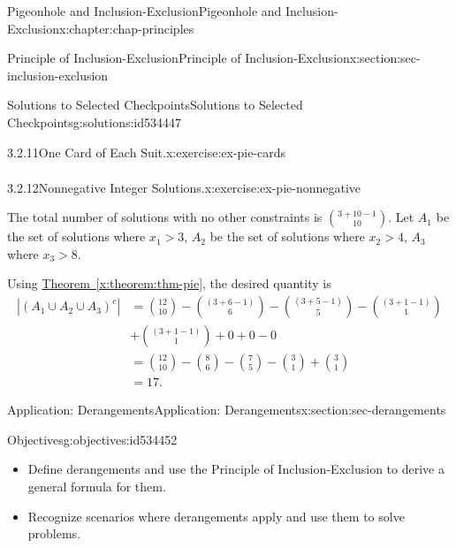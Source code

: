 \documentclass[oneside,10pt,]{book}
\newcommand{\xreffont}{\relax}
\numberwithin{equation}{section}
\newlength{\qrsize}
\newlength{\previewwidth}
\newcommand{\gt}{>}
\newcommand{\amp}{&}
\begin{document}
\begin{chapterptx}{Pigeonhole and Inclusion-Exclusion}{}{Pigeonhole and Inclusion-Exclusion}{}{}{x:chapter:chap-principles}
\begin{sectionptx}{Principle of Inclusion-Exclusion}{}{Principle of Inclusion-Exclusion}{}{}{x:section:sec-inclusion-exclusion}
\begin{solutions-subsection-numberless}{Solutions to Selected Checkpoints}{}{Solutions to Selected Checkpoints}{}{}{g:solutions:id534447}
\begin{inlinesolution}{3.2.11}{One Card of Each Suit.}{x:exercise:ex-pie-cards}
\begin{align*}
\end{align*}
%
\end{inlinesolution}%
\begin{inlinesolution}{3.2.12}{Nonnegative Integer Solutions.}{x:exercise:ex-pie-nonnegative}%
\par\smallskip%
\noindent\hypertarget{g:solution:id534388-main}{}The total number of solutions with no other constraints is \(\displaystyle\binom{3+10-1}{10}\). Let \(A_1\) be the set of solutions where \(x_1 \gt 3\), \(A_2\) be the set of solutions where \(x_2 \gt 4\), \(A_3\) where \(x_3 \gt 8\).%
\par
Using \hyperref[x:theorem:thm-pie]{Theorem~{\xreffont\ref{x:theorem:thm-pie}}}, the desired quantity is%
\begin{align*}
|(A_1 \cup A_2 \cup A_3)^c| \amp = {{12}\choose{10}} - {(3+6-1)\choose{6}} - {(3+5-1)\choose{5}} - {(3+1-1)\choose{1}} \\
\amp + {{(3+1-1)}\choose{1}} + 0 + 0 - 0 \\
\amp = {{12}\choose{10}} - {{8}\choose{6}} - {{7}\choose{5}} - {{3}\choose{1}} + {{3}\choose{1}}\\
\amp = 17\text{.}
\end{align*}
%
\end{inlinesolution}%
\end{solutions-subsection-numberless}
\end{sectionptx}
%
%
\typeout{************************************************}
\typeout{************************************************}
%
\begin{sectionptx}{Application: Derangements}{}{Application: Derangements}{}{}{x:section:sec-derangements}
\begin{objectives}{Objectives}{g:objectives:id534452}
%
\begin{itemize}[label=\textbullet]
\item{}Define derangements and use the Principle of Inclusion-Exclusion to derive a general formula for them.%
\item{}Recognize scenarios where derangements apply and use them to solve problems.%
\end{itemize}
\end{objectives}
\begin{sidebyside}{1}{0}{0}{0}%
\begin{sbspanel}{1}%
\setlength{\qrsize}{9em}
\setlength{\previewwidth}{\linewidth}
\addtolength{\previewwidth}{-\qrsize}
\begin{tcbraster}[raster columns=2, raster column skip=1pt, raster halign=center, raster force size=false, raster left skip=0pt, raster right skip=0pt]%

\end{tcbraster}
\end{sbspanel}
\end{sidebyside}
\end{sectionptx}
\end{chapterptx}
\end{document}
